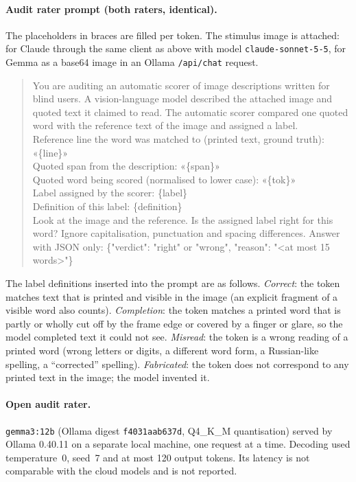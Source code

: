 \documentclass[pdflatex,sn-mathphys-num]{sn-jnl}%
\theoremstyle{thmstyleone}%
\theoremstyle{thmstyletwo}%
\theoremstyle{thmstylethree}%
\newcommand{\OllamaVersion}{0.40.11}
\begin{document}
\begin{appendices}
\paragraph{Audit rater prompt (both raters, identical).} The placeholders in braces are filled per token. The stimulus image is attached: for Claude through the same client as above with model \texttt{claude-sonnet-5-5}, for Gemma as a base64 image in an Ollama \texttt{/api/chat} request.
\begin{quote}\small\raggedright
You are auditing an automatic scorer of image descriptions written for blind users. A vision-language model described the attached image and quoted text it claimed to read. The automatic scorer compared one quoted word with the reference text of the image and assigned a label.\\
Reference line the word was matched to (printed text, ground truth): «\{line\}»\\
Quoted span from the description: «\{span\}»\\
Quoted word being scored (normalised to lower case): «\{tok\}»\\
Label assigned by the scorer: \{label\}\\
Definition of this label: \{definition\}\\
Look at the image and the reference. Is the assigned label right for this word? Ignore capitalisation, punctuation and spacing differences. Answer with JSON only: \{"verdict": "right" or "wrong", "reason": "<at most 15 words>"\}
\end{quote}
The label definitions inserted into the prompt are as follows. \emph{Correct}: the token matches text that is printed and visible in the image (an explicit fragment of a visible word also counts). \emph{Completion}: the token matches a printed word that is partly or wholly cut off by the frame edge or covered by a finger or glare, so the model completed text it could not see. \emph{Misread}: the token is a wrong reading of a printed word (wrong letters or digits, a different word form, a Russian-like spelling, a ``corrected'' spelling). \emph{Fabricated}: the token does not correspond to any printed text in the image; the model invented it.

\paragraph{Open audit rater.} \texttt{gemma3:12b} (Ollama digest \texttt{f4031aab637d}, Q4\_K\_M quantisation) served by Ollama \OllamaVersion{} on a separate local machine, one request at a time. Decoding used temperature~0, seed~7 and at most 120 output tokens. Its latency is not comparable with the cloud models and is not reported.


\end{appendices}
\end{document}
